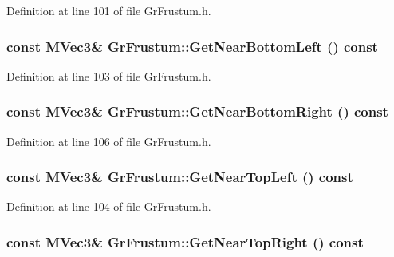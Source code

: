 \begin{CompactItemize}
Definition at line 101 of file GrFrustum.h.\hypertarget{class_gr_frustum_6c22fff9cd8287371cdf66a087d04ce9}{
\subsubsection[{GetNearBottomLeft}]{\setlength{\rightskip}{0pt plus 5cm}const {\bf MVec3}\& GrFrustum::GetNearBottomLeft () const}}
\label{class_gr_frustum_6c22fff9cd8287371cdf66a087d04ce9}




Definition at line 103 of file GrFrustum.h.\hypertarget{class_gr_frustum_7cfe947d96c2d3fe483ef2b45535e246}{
\subsubsection[{GetNearBottomRight}]{\setlength{\rightskip}{0pt plus 5cm}const {\bf MVec3}\& GrFrustum::GetNearBottomRight () const}}
\label{class_gr_frustum_7cfe947d96c2d3fe483ef2b45535e246}




Definition at line 106 of file GrFrustum.h.\hypertarget{class_gr_frustum_5fc3092ebbcba98ef8d5e0c727d529e4}{
\subsubsection[{GetNearTopLeft}]{\setlength{\rightskip}{0pt plus 5cm}const {\bf MVec3}\& GrFrustum::GetNearTopLeft () const}}
\label{class_gr_frustum_5fc3092ebbcba98ef8d5e0c727d529e4}




Definition at line 104 of file GrFrustum.h.\hypertarget{class_gr_frustum_199f18b22800f33724f6df2c69e489a9}{
\subsubsection[{GetNearTopRight}]{\setlength{\rightskip}{0pt plus 5cm}const {\bf MVec3}\& GrFrustum::GetNearTopRight () const}}
\label{class_gr_frustum_199f18b22800f33724f6df2c69e489a9}





\end{CompactItemize}
